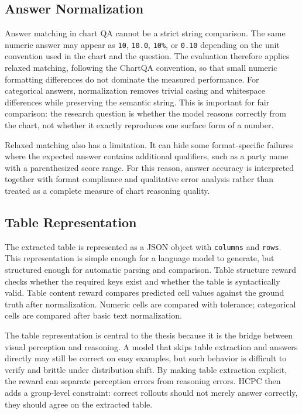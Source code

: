 \documentclass{iutbscthesis}
\begin{document}
\subsection{Answer Normalization}

Answer matching in chart QA cannot be a strict string comparison. The same numeric answer may appear as \texttt{10}, \texttt{10.0}, \texttt{10\%}, or \texttt{0.10} depending on the unit convention used in the chart and the question. The evaluation therefore applies relaxed matching, following the ChartQA convention, so that small numeric formatting differences do not dominate the measured performance. For categorical answers, normalization removes trivial casing and whitespace differences while preserving the semantic string. This is important for fair comparison: the research question is whether the model reasons correctly from the chart, not whether it exactly reproduces one surface form of a number.

Relaxed matching also has a limitation. It can hide some format-specific failures where the expected answer contains additional qualifiers, such as a party name with a parenthesized score range. For this reason, answer accuracy is interpreted together with format compliance and qualitative error analysis rather than treated as a complete measure of chart reasoning quality.

\subsection{Table Representation}

The extracted table is represented as a JSON object with \texttt{columns} and \texttt{rows}. This representation is simple enough for a language model to generate, but structured enough for automatic parsing and comparison. Table structure reward checks whether the required keys exist and whether the table is syntactically valid. Table content reward compares predicted cell values against the ground truth after normalization. Numeric cells are compared with tolerance; categorical cells are compared after basic text normalization.

The table representation is central to the thesis because it is the bridge between visual perception and reasoning. A model that skips table extraction and answers directly may still be correct on easy examples, but such behavior is difficult to verify and brittle under distribution shift. By making table extraction explicit, the reward can separate perception errors from reasoning errors. HCPC then adds a group-level constraint: correct rollouts should not merely answer correctly, they should agree on the extracted table.
\end{document}

